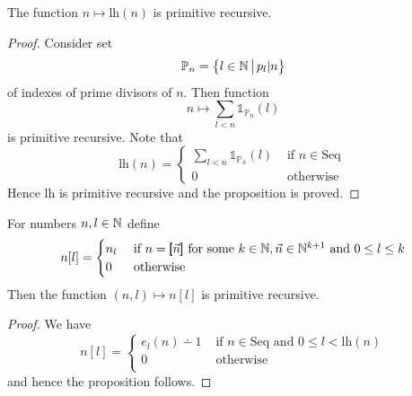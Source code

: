 \documentclass[10pt]{amsart}
\begin{document}
\begin{proposition}\label{proposition:length_is_primitive_recursive}
	The function $n \mapsto \mathrm{lh}(n)$ is primitive recursive.
\end{proposition}
\begin{proof}
	Consider set
	$$\mathbb{P}_n = \big\{l \in {\mathbb N}\,\big|\,p_l|n\big\}$$
	of indexes of prime divisors of $n$. Then function
	$$n \mapsto \sum_{l < n}\mathbb{1}_{\mathbb{P}_n}(l)$$
	is primitive recursive. Note that
	$$\mathrm{lh}(n) = \begin{cases}
			\sum_{l < n}\mathbb{1}_{\mathbb{P}_n}(l) & \mbox{ if }n \in \mathrm{Seq} \\
			0                                        & \mbox{ otherwise }
		\end{cases}$$
	Hence $\mathrm{lh}$ is primitive recursive and the proposition is proved.
\end{proof}

\begin{proposition}\label{proposition:sequence_element_access_is_primitive_recursive}
	For numbers $n, l \in {\mathbb N}$ define
	$$n[l] = \begin{cases}
			n_l & \mbox{ if }n = \pmb{[}\vec{n}\pmb{]}\mbox{ for some }k\in {\mathbb N},\vec{n}\in {\mathbb N}^{k + 1}\mbox{ and }0 \leq l \leq k \\
			0   & \mbox{ otherwise }                                                                                              \\
		\end{cases}$$
	Then the function $(n,l) \mapsto n[l]$ is primitive recursive.
\end{proposition}
\begin{proof}
	We have
	$$n[l] = \begin{cases}
			e_{l}(n) \dotminus 1 & \mbox{ if }n \in \mathrm{Seq}\mbox{ and }0\leq l < \mathrm{lh}(n) \\
			0                    & \mbox{ otherwise }                                                \\
		\end{cases}$$
	and hence the proposition follows.
\end{proof}
\end{document}
